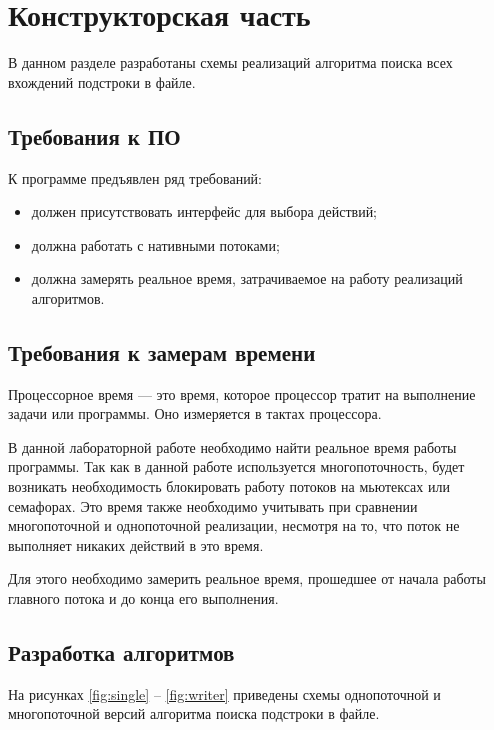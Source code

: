 \chapter{Конструкторская часть}

В данном разделе разработаны схемы реализаций алгоритма поиска всех вхождений подстроки в файле.

\section{Требования к ПО}

К программе предъявлен ряд требований:

\begin{itemize}[label=---]
	\item должен присутствовать интерфейс для выбора действий;
	\item должна работать с нативными потоками;
	\item должна замерять реальное время, затрачиваемое на работу реализаций алгоритмов.
\end{itemize}

\section{Требования к замерам времени}

Процессорное время — это время, которое процессор тратит на выполнение задачи или программы.
Оно измеряется в тактах процессора.

В данной лабораторной работе необходимо найти реальное время работы программы.
Так как в данной работе используется многопоточность, будет возникать необходимость блокировать работу потоков на мьютексах или семафорах.
Это время также необходимо учитывать при сравнении многопоточной и однопоточной реализации, несмотря на то, что поток не выполняет никаких действий в это время.

Для этого необходимо замерить реальное время, прошедшее от начала работы главного потока и до конца его выполнения.

\section{Разработка алгоритмов}

На рисунках \ref{fig:single} -- \ref{fig:writer} приведены схемы однопоточной и многопоточной версий алгоритма поиска подстроки в файле.

